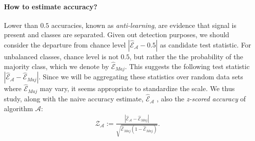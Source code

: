 \documentclass[12pt,a4paper]{article}
\theoremstyle{definition}
\newcommand{\accEstim}{\hat{\mathcal{E}}}
\newcommand{\accZ}{\hat{\mathcal{Z}}}
\newcommand{\algo}{\mathcal{A}}
\newcommand{\majority}{\accEstim_{Maj}}
\begin{document}
\paragraph{How to estimate accuracy?}
\label{sec:estimate_accuracy}
Lower than $0.5$ accuracies, known as \emph{anti-learning}, are evidence that signal is present and classes are separated. Given out detection purposes, we should consider the departure from chance level $|\accEstim_{\algo}-0.5|$ as candidate test statistic.
For unbalanced classes, chance level is not $0.5$, but rather the the probability of the majority class, which we denote by $\majority$.
This suggests the following test statistic $|\accEstim_{\algo}-\majority|$.
Since we will be aggregating these statistics over random data sets where $\majority$ may vary, it seems appropriate to standardize the scale. 
We thus study, along with the naive accuracy estimate, $\accEstim_{\algo}$ , also the \emph{z-scored accuracy} of algorithm $\algo$:
\begin{align}
\label{eq:z_scored_accuracy}
	\accZ_{\algo} := \frac{|\accEstim_{\algo}-\majority|}{\sqrt{\majority(1-\majority)}}.
\end{align} 

\bigskip
\end{document}
